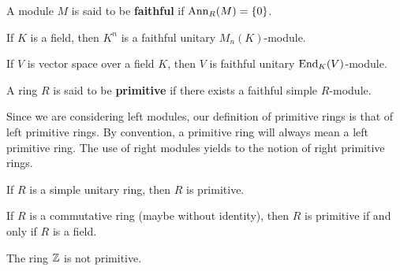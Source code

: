 
\begin{definition}
A module $M$ is said to be \textbf{faithful} if $\operatorname{Ann}_R(M)=\{0\}$. 
\end{definition}

\begin{example}
	If $K$ is a field, then $K^n$ is a faithful unitary $M_n(K)$-module.
\end{example}

\begin{example}
	If $V$ is vector space over a field $K$, then $V$ is faithful unitary $\operatorname{End}_K(V)$-module.
\end{example}

\begin{definition}
A ring $R$ is said to be \textbf{primitive} if there exists a faithful simple $R$-module.  
\end{definition}

Since 
we are considering left modules, our definition of primitive rings is that of left primitive rings.
By convention, a primitive ring
will always mean a left primitive ring. 
The use 
of right modules yields to the notion of right primitive rings.  

\begin{exercise}
	\label{xca:simple=>prim}
	If $R$ is a simple unitary ring, then $R$ is primitive. 
\end{exercise}

\begin{exercise}
	\label{xca:prim+conm=cuerpo}
	If $R$ is a commutative ring (maybe without identity), then $R$ is primitive if and only if $R$ is a field. 
\end{exercise}

\begin{example}
	The ring $\mathbb{Z}$ is not primitive. 
\end{example}

